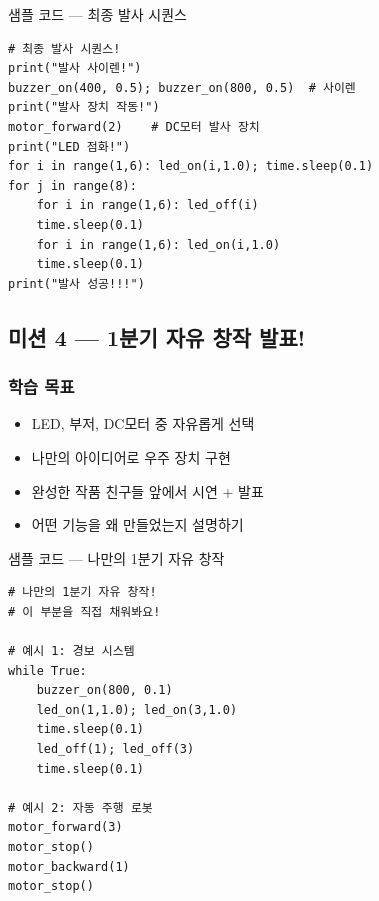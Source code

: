 \begin{labbox}{샘플 코드 --- 최종 발사 시퀀스}
\begin{verbatim}
# 최종 발사 시퀀스!
print("발사 사이렌!")
buzzer_on(400, 0.5); buzzer_on(800, 0.5)  # 사이렌
print("발사 장치 작동!")
motor_forward(2)    # DC모터 발사 장치
print("LED 점화!")
for i in range(1,6): led_on(i,1.0); time.sleep(0.1)
for j in range(8):
    for i in range(1,6): led_off(i)
    time.sleep(0.1)
    for i in range(1,6): led_on(i,1.0)
    time.sleep(0.1)
print("발사 성공!!!")
\end{verbatim}
\end{labbox}

\subsection{미션 4 --- 1분기 자유 창작 발표!}
\label{subsec:ch12-m4}

\begin{storybox}
\end{storybox}

\subsubsection*{학습 목표}
\begin{itemize}[leftmargin=1.4em]
  \item LED, 부저, DC모터 중 자유롭게 선택
  \item 나만의 아이디어로 우주 장치 구현
  \item 완성한 작품 친구들 앞에서 시연 + 발표
  \item 어떤 기능을 왜 만들었는지 설명하기
\end{itemize}

\begin{labbox}{샘플 코드 --- 나만의 1분기 자유 창작}
\begin{verbatim}
# 나만의 1분기 자유 창작!
# 이 부분을 직접 채워봐요!

# 예시 1: 경보 시스템
while True:
    buzzer_on(800, 0.1)
    led_on(1,1.0); led_on(3,1.0)
    time.sleep(0.1)
    led_off(1); led_off(3)
    time.sleep(0.1)

# 예시 2: 자동 주행 로봇
motor_forward(3)
motor_stop()
motor_backward(1)
motor_stop()
\end{verbatim}
\end{labbox}

